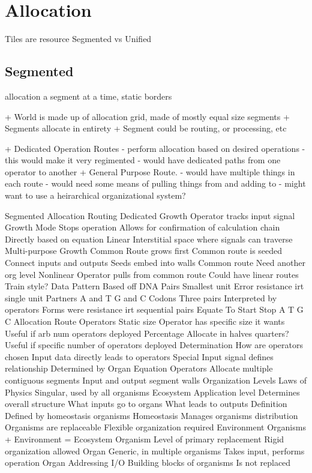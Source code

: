 \documentclass[article,12pt,oneside]{memoir}
\begin{document}
\section{Allocation}

Tiles are resource
Segmented vs Unified

\subsection{Segmented}

allocation a segment at a time, static borders

+ World is made up of allocation grid, made of mostly equal size segments
+ Segments allocate in entirety 
+ Segment could be routing, or processing, etc


+ Dedicated Operation Routes
- perform allocation based on desired operations
- this would make it very regimented
- would have dedicated paths from one operator to another
+ General Purpose Route.
- would have multiple things in each route
- would need some means of pulling things from and adding to
- might want to use a heirarchical organizational system?


Segmented Allocation
Routing
Dedicated
Growth
Operator tracks input signal
Growth Mode
Stops operation
Allows for confirmation of calculation chain
Directly based on equation
Linear
Interstitial space where signals can traverse
Multi-purpose
Growth
Common Route grows first
Common route is seeded
Connect inputs and outputs
Seeds embed into walls
Common route
Need another org level
Nonlinear
Operator pulls from common route
Could have linear routes
Train style?
Data
Pattern
Based off DNA
Pairs
Smallest unit
Error resistance irt single unit
Partners
A and T
G and C
Codons
Three pairs
Interpreted by operators
Forms were resistance irt sequential pairs
Equate To
Start
Stop
A
T
G
C
Allocation
Route
Operators
Static size
Operator has specific size it wants
Useful if arb num operators deployed
Percentage
Allocate in halves quarters?
Useful if specific number of operators deployed
Determination
How are operators chosen
Input data directly leads to operators
Special Input signal defines relationship​
Determined by Organ Equation
Operators
Allocate multiple contiguous segments
Input and output segment walls
Organization Levels
Laws of Physics
Singular, used by all organisms
Ecosystem
Application level
Determines
overall structure
What inputs go to organs
What leads to outputs
Definition
Defined by homeostasis organisms
Homeostasis
Manages organisms distribution
Organisms are replaceable
Flexible organization required
Environment
Organisms + Environment = Ecosystem
Organism
Level of primary replacement
Rigid organization allowed
Organ
Generic, in multiple organisms
Takes input, performs operation
Organ Addressing I/O
Building blocks of organisms
Is not replaced
\end{document}
